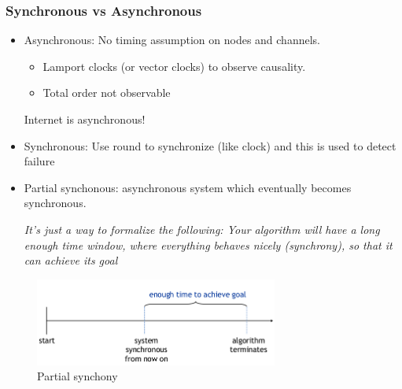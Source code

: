 \subsubsection{Synchronous vs Asynchronous}
\begin{itemize}
    \item Asynchronous: No timing assumption on nodes and channels.

        \begin{itemize}
           \item Lamport clocks (or vector clocks) to observe causality.
           \item Total order not observable
       \end{itemize}

       Internet is asynchronous!

    \item Synchronous: Use round to synchronize (like clock) and this
        is used to detect failure

    \item Partial synchonous: asynchronous system which eventually
        becomes synchronous.

        \textit{It’s just a way to formalize the following: Your
            algorithm will have a long enough time
            window, where everything behaves nicely
        (synchrony), so that it can achieve its goal}
\end{itemize}


\begin{figure}[!ht]
    \centering
    \includegraphics[width=8cm]{img/partialsynchronous.png}
    \caption{Partial synchony}
\end{figure}
\FloatBarrier{}
